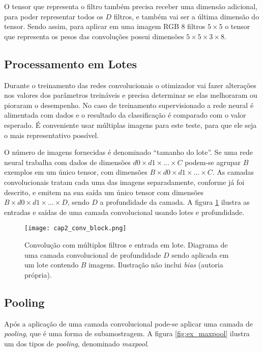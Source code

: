 O tensor que representa o filtro também precisa receber uma dimensão adicional,
para poder representar todos os $D$ filtros, e também vai ser a última dimensão
do tensor. Sendo assim, para aplicar em uma imagem RGB 8 filtros $5 \times 5$ o
tensor que representa os pesos das convoluções possui dimensões $5 \times 5
\times 3 \times 8$.

\subsection{Processamento em Lotes}
Durante o treinamento das redes convolucionais o otimizador vai fazer
alterações nos valores dos parâmetros treináveis e precisa determinar se elas
melhoraram ou pioraram o desempenho. No caso de treinamento supervisionado
a rede neural é alimentada com dados e o resultado da classificação é comparado
com o valor esperado. É conveniente usar múltiplas imagens para este teste,
para que ele seja o mais representativo possível.

O número de imagens fornecidas é denominado ``tamanho do lote''. Se uma rede
neural trabalha com dados de dimensões $d0 \times d1 \times ... \times C$
podem-se agrupar $B$ exemplos em
um único tensor, com dimensões $B \times d0 \times d1 \times ... \times C$.
As camadas convolucionais tratam cada uma das imagens separadamente,
conforme já foi descrito, e emitem na sua saída um
único tensor com dimensões $B \times d0 \times d1 \times ... \times D$, sendo
$D$ a profundidade da camada. A figura \ref{fig:cap2_conv_block} ilustra as
entradas e saídas de uma camada convolucional usando lotes e profundidade.

\begin{figure}[!htb]
	\centering
	\texttt{[image: cap2\_conv\_block.png]}
	\caption[Convolução com múltiplos filtros e entrada em lote]{
		Convolução com múltiplos filtros e entrada em lote.
		Diagrama de uma camada convolucional de profundidade $D$ sendo aplicada em
		um lote contendo $B$ imagens. Ilustração não inclui \emph{bias}
		(autoria própria).}
	\label{fig:cap2_conv_block}
\end{figure}

\subsection{Pooling}
Após a aplicação de uma camada convolucional pode-se aplicar uma camada de
\emph{pooling}, que é uma forma de subamostragem. A figura
\ref{fig:ex_maxpool} ilustra um dos tipos de \emph{pooling}, denominado
\emph{maxpool}.

